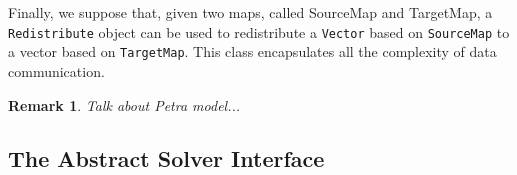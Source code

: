 \documentclass[acmtocl]{acmtrans2m}
\newtheorem{remark}{Remark}
\begin{document}
Finally, we suppose that, given two maps, called SourceMap and TargetMap, a
{\tt Redistribute} object can be used to redistribute a {\tt Vector} based on
{\tt SourceMap} to a vector based on {\tt TargetMap}. This class encapsulates
all the complexity of data communication.

\begin{remark}
Talk about Petra model...
\end{remark}
\subsection{The Abstract Solver Interface}
\label{sec:asi}
\end{document}
